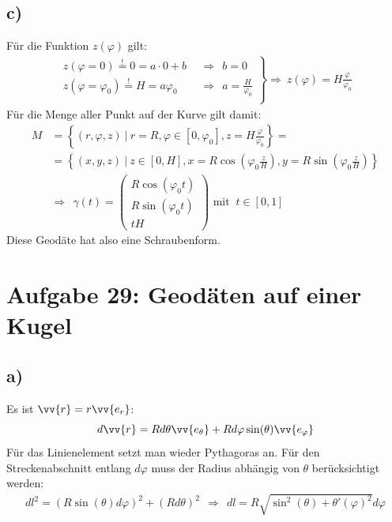 \documentclass[a4paper,12pt]{article}
\begin{document}
\subsection*{c)}
Für die Funktion $z(\varphi)$ gilt:
\begin{align*} \left. \begin{array}{ll}
z(\varphi =0)\overset{!}{=}0 = a\cdot 0+b\ \ &\Rightarrow\ \ b=0\\
z(\varphi =\varphi_0)\overset{!}{=}H = a\varphi_0\ \ &\Rightarrow\ \ a=\frac{H}{\varphi_0} \\ \end{array}\right\}\Rightarrow\ z(\varphi)=H\frac{\varphi}{\varphi_0}
\end{align*}
Für die Menge aller Punkt auf der Kurve gilt damit:
\begin{align*}
M&=\left\{(r,\varphi,z)\ \big\vert\ r=R, \varphi\in [0,\varphi_0], z=H\frac{\varphi}{\varphi_0} \right\}=\\
&=\left\{(x,y,z)\ \big\vert\ z\in [0,H], x=R\cos(\varphi_0\frac{z}{H}), y=R\sin(\varphi_0\frac{z}{H}) \right\}\\
&\Rightarrow\ \ \gamma(t) = \begin{pmatrix} R\cos(\varphi_0t) \\ R\sin(\varphi_0t) \\ tH \end{pmatrix}\textrm{   mit }\ t\in [0,1]
\end{align*}
Diese Geodäte hat also eine Schraubenform.
\section*{Aufgabe 29: Geodäten auf einer Kugel}
\subsection*{a)}
Es ist $\vv{r}=r\vv{e_r}$:
$$d\vv{r}=Rd\theta\vv{e_{\theta}} + Rd\varphi\sin(\theta)\vv{e_{\varphi}}$$
Für das Linienelement setzt man wieder Pythagoras an. Für den Streckenabschnitt entlang $d\varphi$ muss der Radius abhängig von $\theta$ berücksichtigt werden:
\begin{align*}
dl^2=(R\sin(\theta)d\varphi)^2+(Rd\theta)^2\ \ \Rightarrow\ \ dl = R\sqrt{\sin^2(\theta)+\theta'(\varphi)^2}d\varphi
\end{align*}
\end{document}
